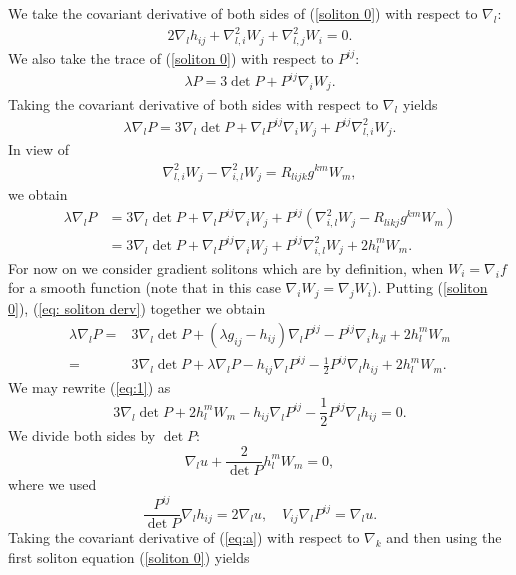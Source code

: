 \documentclass{amsart}
\theoremstyle{definition}
\theoremstyle{remark}
\numberwithin{equation}{section}
\begin{document}
We take the covariant derivative of both sides of (\ref{soliton 0}) with respect to $\nabla_l:$
\begin{align}\label{eq: soliton derv}
2\nabla_lh_{ij}+\nabla^2_{l,i}W_j+\nabla^2_{l,j}W_i=0.
\end{align}
We also take the trace of (\ref{soliton 0}) with respect to $P^{ij}$:
\begin{align}\label{trace}
\lambda P=3\det P+P^{ij}\nabla_iW_j.
\end{align}
Taking the covariant derivative of both sides with respect to $\nabla_l$ yields
\begin{align*}
\lambda \nabla_l P=3\nabla_l\det P+\nabla_l P^{ij}\nabla_iW_j+P^{ij}\nabla^2_{l,i}W_j.
\end{align*}
In view of
\begin{align*}
\nabla^2_{l,i}W_j-\nabla^2_{i,l}W_j=R_{lijk} g^{km}W_m,
\end{align*}
we obtain
\begin{align}\label{equ00}
\lambda \nabla_l P&=3\nabla_l\det P+\nabla_l P^{ij}\nabla_iW_j+P^{ij}(\nabla^2_{i,l}W_j -R_{likj}g^{km}W_m)\\
&=3\nabla_l\det P+\nabla_l P^{ij}\nabla_iW_j+P^{ij}\nabla^2_{i,l}W_j+2h_l^mW_m.\nonumber
\end{align}
For now on  we consider gradient solitons which are by definition, when $W_i=\nabla_if$ for a smooth function (note that in this case $\nabla_iW_j=\nabla_jW_i$).
Putting (\ref{soliton 0}), (\ref{eq: soliton derv}) together we obtain
\begin{align}\label{eq:1}
\lambda \nabla_l P
=&3\nabla_l\det P+(\lambda g_{ij}-h_{ij})\nabla_l P^{ij}-P^{ij}\nabla_ih_{jl}+2h_l^mW_m\\
=&3\nabla_l\det P+\lambda \nabla_l P-h_{ij}\nabla_l P^{ij}-\frac{1}{2}P^{ij}\nabla_lh_{ij}+2h_l^mW_m.\nonumber
\end{align}
We may rewrite (\ref{eq:1}) as
\[3\nabla_l\det P+2h_l^mW_m-h_{ij}\nabla_l P^{ij}-\frac{1}{2}P^{ij}\nabla_lh_{ij}=0.\]
We divide both sides by $\det P:$
\begin{equation}\label{eq:a}
\nabla_lu+\frac{2}{\det P}h_l^mW_m=0,
\end{equation}
where we used
\begin{equation}\label{eq0}
\frac{P^{ij}}{\det P}\nabla_lh_{ij}=2\nabla_lu,\quad V_{ij}\nabla_lP^{ij}=\nabla_lu.
\end{equation}
Taking the covariant derivative of (\ref{eq:a}) with respect to $\nabla_k$ and then using the first soliton equation (\ref{soliton 0}) yields
\end{document}
